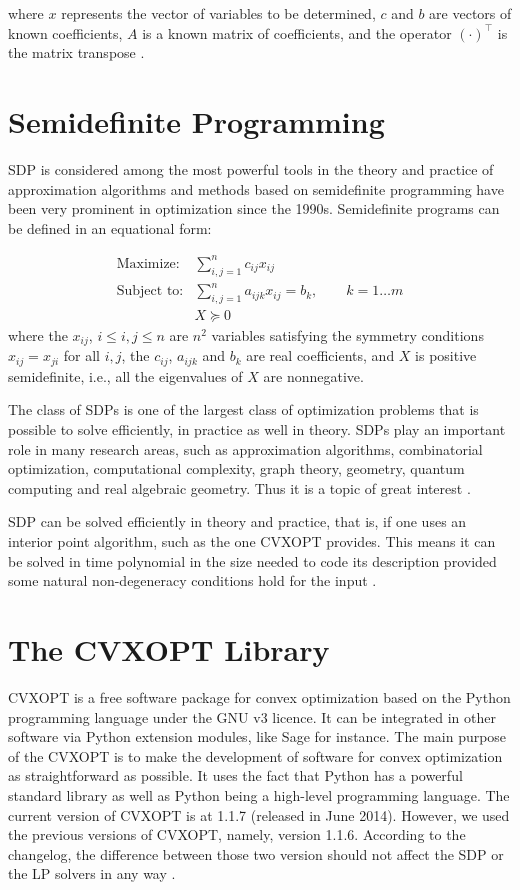 where $x$ represents the vector of variables to be determined, $c$ and $b$ are vectors of known coefficients, $A$ is a known matrix of coefficients, and the operator $(\cdot)^{\top}$ is the matrix transpose \cite{wikilinear}.





\section{Semidefinite Programming}
\label{sdp}
SDP is considered among the most powerful tools in the theory and practice of approximation algorithms and methods based on semidefinite programming have been very prominent in optimization since the 1990s. Semidefinite programs can be defined in an equational form:

\begin{align}
\text{Maximize:} &\sum_{i,j=1}^n c_{ij}x_{ij}\\
\text{Subject to:} &\sum_{i,j=1}^n a_{ijk}x_{ij} = b_k, \qquad k=1\ldots m\\
&X \succeq 0	
\end{align}
where the $x_{ij}$, $i \leq i,j \leq n$ are $n^2$ variables satisfying the symmetry conditions $x_{ij} = x_{ji}$ for all $i,j$, the $c_{ij}$, $a_{ijk}$ and $b_k$ are real coefficients, and $X$ is positive semidefinite, i.e., all the eigenvalues of $X$ are nonnegative.

The class of SDPs is one of the largest class of optimization problems that is possible to solve efficiently, in practice as well in theory. SDPs play an important role in many research areas, such as approximation algorithms, combinatorial optimization, computational complexity, graph theory, geometry, quantum computing and real algebraic geometry. Thus it is a topic of great interest \cite{yellowbook}.


  SDP can be solved efficiently in theory and practice, that is, if one uses an interior point algorithm, 
  such as the one CVXOPT provides.  This means it can 
  be solved in time polynomial in the size needed to code its description
  provided some natural non-degeneracy conditions hold for the input \cite{whitebook}.



\section{The CVXOPT Library}
\label{cvxopt}
CVXOPT is a free software package for convex optimization based on the Python programming language under the GNU v3 licence. It can be integrated in other software via Python extension modules, like Sage for instance. The main purpose of the CVXOPT is to make the development of software for convex optimization as straightforward as possible. It uses the fact that Python has a powerful standard library as well as Python being a high-level programming language. The current version of CVXOPT is at 1.1.7 (released in June 2014). However, we used the previous versions of CVXOPT, namely, version 1.1.6. According to the changelog, the difference between those two version should not affect the SDP or the LP solvers in any way \cite{cvxopthome}.



